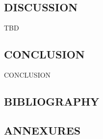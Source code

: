\documentclass[14pt]{extarticle}
\begin{document}
\clearpage


\clearpage


\clearpage


\clearpage


\clearpage


\clearpage


\clearpage


\clearpage


\clearpage


\clearpage


\clearpage


\clearpage


\clearpage


\clearpage


\clearpage


\clearpage


\clearpage


\clearpage


\clearpage


\clearpage


\clearpage


\null
\vfill
\begin{flushright}
    \section{DISCUSSION}
\end{flushright}
\hrulefill
\newpage

TBD

\newpage
\null
\vfill
\begin{flushright}
    \section{CONCLUSION}
\end{flushright}
\hrulefill
\newpage

CONCLUSION

\newpage
\null
\vfill
\begin{flushright}
    \section{BIBLIOGRAPHY}
\end{flushright}

\hrulefill
\newpage

\printbibliography[]

\newpage

\null
\vfill
\begin{flushright}
    \section{ANNEXURES}
\end{flushright}
\hrulefill
\newpage
\end{document}
